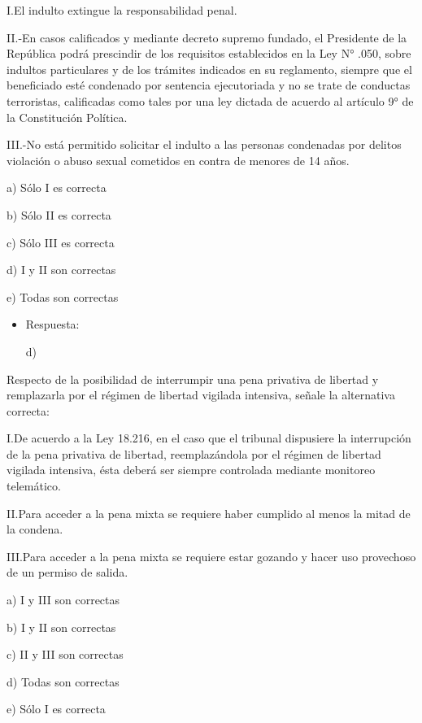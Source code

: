 \documentclass[letterpaper, 11pt]{article}
\begin{document}
I.El indulto extingue la responsabilidad penal.



II.-En casos calificados y mediante decreto supremo fundado, el
Presidente de la República podrá prescindir de los requisitos
establecidos en la Ley N° .050, sobre indultos particulares y de los
trámites indicados en su reglamento, siempre que el beneficiado esté
condenado por sentencia ejecutoriada y no se trate de conductas
terroristas, calificadas como tales por una ley dictada de acuerdo al
artículo 9° de la Constitución Política.



III.-No está permitido solicitar el indulto a las personas condenadas
por delitos violación o abuso sexual cometidos en contra de menores de
14 años.


a) Sólo I es correcta

b) Sólo II es correcta

c) Sólo III es correcta

d) I y II son correctas

e) Todas son correctas


\begin{itemize}
\item Respuesta:

d)
\end{itemize}



Respecto de la posibilidad de interrumpir una pena privativa de
libertad y remplazarla por el régimen de libertad vigilada intensiva,
señale la alternativa correcta:


I.De acuerdo a la Ley 18.216, en el caso que el tribunal dispusiere la
interrupción de la pena privativa de libertad, reemplazándola por el
régimen de libertad vigilada intensiva, ésta deberá ser siempre
controlada mediante monitoreo telemático.



II.Para acceder a la pena mixta se requiere haber cumplido al menos
la mitad de la condena.

III.Para acceder a la pena mixta se requiere estar gozando y hacer uso
provechoso de un permiso de salida.


a) I y III son correctas

b) I y II son correctas

c) II y III son correctas

d) Todas son correctas

e) Sólo I es correcta
\end{document}
